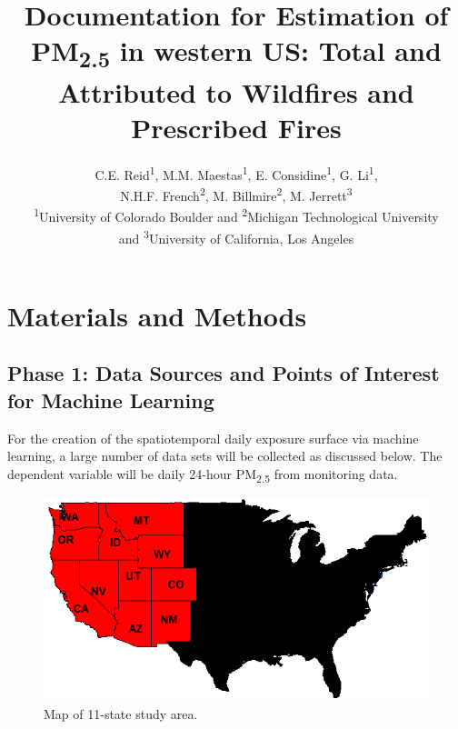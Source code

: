 \documentclass[letterpaper,12pt]{article}
\title{Documentation for Estimation of PM\textsubscript{2.5} in western US: Total and Attributed to Wildfires and Prescribed Fires}
\author{C.E. Reid\textsuperscript{1}, 
M.M. Maestas\textsuperscript{1}, 
E. Considine\textsuperscript{1}, 
G. Li\textsuperscript{1}, \\
N.H.F. French\textsuperscript{2}, 
M. Billmire\textsuperscript{2}, 
M. Jerrett\textsuperscript{3} \\ \textsuperscript{1}University of Colorado Boulder and \textsuperscript{2}Michigan Technological University \\ and \textsuperscript{3}University of California, Los Angeles}
\begin{document}
\selectfont
{}

\maketitle


\tableofcontents

\pagebreak





\section{Materials and Methods}

\subsection{Phase 1: Data Sources and Points of Interest for Machine Learning}
For the creation of the spatiotemporal daily exposure surface via machine learning, a large number of data sets will be collected as discussed below. The dependent variable will be daily 24-hour PM\textsubscript{2.5} from monitoring data.  

\begin{figure}[H] %
\includegraphics[width=1\textwidth]{WesternStatesNoTitleCropped.png} %
\caption{\label{fig:Map11States}Map of 11-state study area.} %
\end{figure} %
\end{document}
